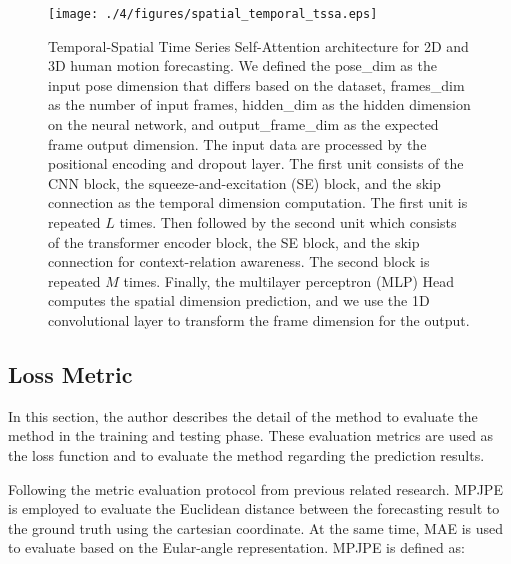 \begin{figure}
    \centering
    \texttt{[image: ./4/figures/spatial\_temporal\_tssa.eps]}
    \caption{
        Temporal-Spatial Time Series Self-Attention architecture for 2D and 3D human motion forecasting. We defined the pose\_dim as the input pose dimension that differs based on the dataset, frames\_dim as the number of input frames, hidden\_dim as the hidden dimension on the neural network, and output\_frame\_dim as the expected frame output dimension.
        The input data are processed by the positional encoding and dropout layer.
        The first unit consists of the CNN block, the squeeze-and-excitation (SE) block, and the skip connection as the temporal dimension computation.
        The first unit is repeated $L$ times.
        Then followed by the second unit which consists of the transformer encoder block, the SE block, and the skip connection for context-relation awareness.
        The second block is repeated $M$ times.
        Finally, the multilayer perceptron (MLP) Head computes the spatial dimension prediction, and we use the 1D convolutional layer to transform the frame dimension for the output.
    }
    \label{fig:cnn+trans}
\end{figure}
\subsection{Loss Metric}\label{4:loss_metric}
In this section, the author describes the detail of the method to evaluate the method in the training and testing phase. 
These evaluation metrics are used as the loss function and to evaluate the method regarding the prediction results.

Following the metric evaluation protocol from previous related research. MPJPE is employed to evaluate the Euclidean distance between the forecasting result to the ground truth using the cartesian coordinate\cite{Sofianos2021,motionmixer2022}. At the same time, MAE is used to evaluate based on the Eular-angle representation\cite{Sofianos2021,motionmixer2022}. MPJPE is defined as:



